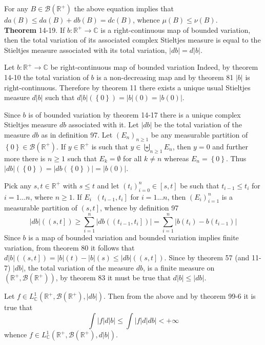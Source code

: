 \documentclass[a4paper]{article}
\newcommand{\obj}[1]{\left\{ #1 \right \}}
\newcommand{\clo}[1]{\left [ #1 \right ]}
\newcommand{\ploc}[1]{\left ( #1 \right ]}
\newcommand{\brac}[1]{\left ( #1 \right )}
\newcommand{\abs}[1]{\left | #1 \right |}
\newcommand{\Real}{\mathbb{R}}
\newcommand{\Cplx}{\mathbb{C}}
\newcommand{\borel}[1]{\mathcal{B}\brac{#1}}
\newcommand{\defn}{\mathop{\overset{\Delta}{=}}\nolimits}
\begin{document}
For any $B\in \borel{\Real^+}$ the above equation implies that $da\brac{B}\leq da\brac{B}+db\brac{B}=dc\brac{B}$, whence $\mu\brac{B}\leq \nu\brac{B}$.\\

\label{thm:cplx_siteltjes_tot_var}\noindent\textbf{Theorem} 14-19.
If $b:\Real^+\to\Cplx$ is a right-continuous map of bounded variation, then the total variation of its associated complex Stieltjes measure is equal to the Stieltjes measure associated with its total variation, $\abs{db}=d\abs{b}$.

Let $b:\Real^+\to\Cplx$ be right-continuous map of bounded variation 
Indeed, by theorem 14-10 the total variation of $b$ is a non-decreasing map and by theorem 81 $\abs{b}$ is right-continuous. Therefore by theorem 11 there exists a unique usual Stieltjes measure $d\abs{b}$ such that $d\abs{b}\brac{\obj{0}}=\abs{b}\brac{0}=\abs{b\brac{0}}$.

Since $b$ is of bounded variation by theorem 14-17 there is a unique complex Stieltjes measure $db$ associated with it. Let $\abs{db}$ be the total variation of the measure $db$ as in definition 97. Let $\brac{E_n}_{n\geq1}$ be any measurable partition of $\obj{0}\in \borel{\Real^+}$. If $y\in \Real^+$ is such that $y\in \biguplus_{n\geq1}E_n$, then $y=0$ and further more there is $n\geq1$ such that $E_k=\emptyset$ for all $k\neq n$ whereas $E_n=\obj{0}$. Thus $\abs{db}\brac{\obj{0}} = \abs{db\brac{\obj{0}}} = \abs{b\brac{0}}$.

Pick any $s,t\in \Real^+$ with $s\leq t$ and let $\brac{t_i}_{i=0}^n\in \clo{s,t}$ be such that $t_{i-1}\leq t_i$ for $i=1\ldots n$, where $n\geq1$. If $E_i\defn \ploc{t_{i-1},t_i}$ for $i=1\ldots n$, then $\brac{E_i}_{i=1}^n$ is a measurable partition of $\ploc{s,t}$, whence by definition 97 \[\abs{db}\brac{\ploc{s,t}} \geq \sum_{i=1}^n \abs{db\brac{\ploc{t_{i-1},t_i}}} = \sum_{i=1}^n \abs{b\brac{t_i}-b\brac{t_{i-1}}}\] Since $b$ is a map of bounded variation and bounded variation implies finite variation, from theorem 80 it follows that $d\abs{b}\brac{\ploc{s,t}} = \abs{b}\brac{t} - \abs{b}\brac{s}\leq \abs{db}\brac{\ploc{s,t}}$. Since by theorem 57 (and 11-7) $\abs{db}$, the total variation of the measure $db$, is a finite measure on $\brac{\Real^+, \borel{\Real^+}}$, by theorem 83 it must be true that $d\abs{b}\leq \abs{db}$.

Let $f\in L^1_\Cplx\brac{\Real^+, \borel{\Real^+}, \abs{db}}$. Then from the above and by theorem 99-6 it is true that \[\int \abs{f} d\abs{b} \leq \int \abs{f} d\abs{db}<+\infty\] whence $f\in L^1_\Cplx\brac{\Real^+, \borel{\Real^+}, d\abs{b}}$.
\end{document}
